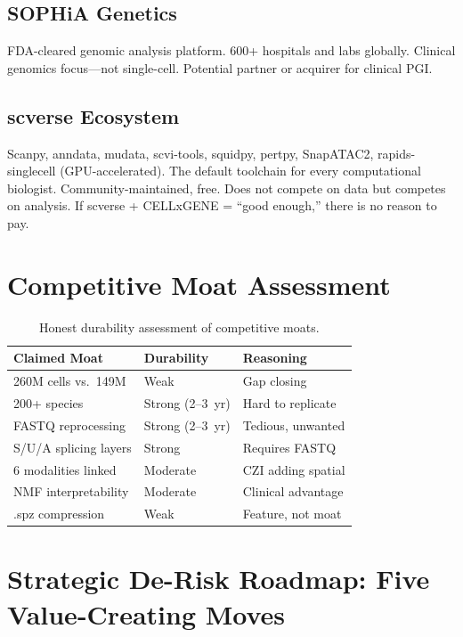 \documentclass[10pt,twocolumn,letterpaper]{article}
\begin{document}
\subsection{SOPHiA Genetics}

FDA-cleared genomic analysis platform. 600+ hospitals and labs globally. Clinical
genomics focus---not single-cell. Potential partner or acquirer for clinical PGI.

\subsection{scverse Ecosystem}

Scanpy, anndata, mudata, scvi-tools, squidpy, pertpy, SnapATAC2,
rapids-singlecell (GPU-accelerated). The default toolchain for every
computational biologist. Community-maintained, free. Does not compete on data
but competes on analysis. If scverse + CELLxGENE = ``good enough,'' there is no
reason to pay.

\section{Competitive Moat Assessment}
\label{sec:moat}

\begin{table}[h]
\centering
\small
\begin{tabular}{@{}lll@{}}
\toprule
\textbf{Claimed Moat} & \textbf{Durability} & \textbf{Reasoning} \\
\midrule
260M cells vs.\ 149M & Weak & Gap closing \\
200+ species & Strong (2--3~yr) & Hard to replicate \\
FASTQ reprocessing & Strong (2--3~yr) & Tedious, unwanted \\
S/U/A splicing layers & Strong & Requires FASTQ \\
6 modalities linked & Moderate & CZI adding spatial \\
NMF interpretability & Moderate & Clinical advantage \\
.spz compression & Weak & Feature, not moat \\
\bottomrule
\end{tabular}
\caption{Honest durability assessment of competitive moats.}
\label{tab:moat}
\end{table}

\section{Strategic De-Risk Roadmap: Five Value-Creating Moves}
\label{sec:moves}
\end{document}
